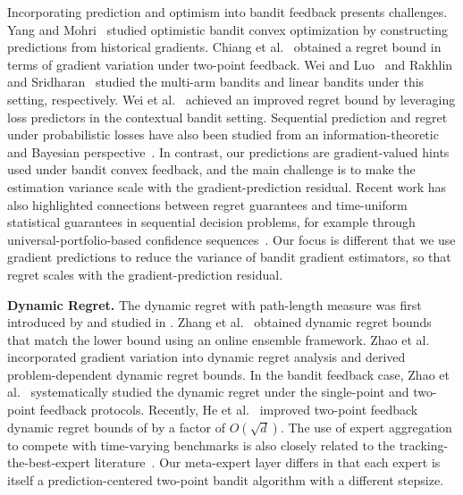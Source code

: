 \documentclass[journal,onecolumn]{IEEEtran}
\theoremstyle{plain}
\theoremstyle{definition}
\theoremstyle{remark}
\begin{document}
Incorporating prediction and optimism into bandit feedback presents challenges. Yang and Mohri~\cite{yang2016optimistic} studied optimistic bandit convex optimization by constructing predictions from historical gradients. Chiang et al.~\cite{chiang2013beating} obtained a regret bound in terms of gradient variation under two-point feedback. Wei and Luo~\cite{wei2018more} and Rakhlin and Sridharan~\cite{rakhlin2013online} studied the multi-arm bandits and linear bandits under this setting, respectively. Wei et al.~\cite{wei2020taking} achieved an improved regret bound by leveraging loss predictors in the contextual bandit setting. Sequential prediction and regret under probabilistic losses have also been
studied from an information-theoretic and Bayesian perspective~\cite{wu2023regret}. In contrast, our predictions are gradient-valued hints
used under bandit convex feedback, and the main challenge is to make the
estimation variance scale with the gradient-prediction residual. Recent work has also highlighted connections between regret guarantees and
time-uniform statistical guarantees in sequential decision problems, for
example through universal-portfolio-based confidence sequences~\cite{orabona2023tight}. Our focus is different that we use gradient predictions
to reduce the variance of bandit gradient estimators, so that regret scales
with the gradient-prediction residual.

\textbf{Dynamic Regret.} The dynamic regret with path-length measure was first introduced by \cite{zinkevich2003online} and studied in \cite{zinkevich2003online,gyorgy2016shifting,zhang2022no}. Zhang et al.~\cite{zhang2018adaptive} obtained dynamic regret bounds that match the lower bound using an online ensemble framework. Zhao et al.~\cite{zhao2024adaptivity} incorporated gradient variation into dynamic regret analysis and derived problem-dependent dynamic regret bounds. In the bandit feedback case, Zhao et al.~\cite{zhao2021bandit} systematically studied the dynamic regret under the single-point and two-point feedback protocols. Recently, He et al.~\cite{he2025non} improved two-point feedback dynamic regret bounds of \cite{zhao2021bandit} by a factor of $O(\sqrt{d})$. The use of expert aggregation to compete with time-varying benchmarks is also
closely related to the tracking-the-best-expert literature~\cite{gyorgy2012efficient}. Our meta-expert layer differs in that each expert
is itself a prediction-centered two-point bandit algorithm with a different
stepsize.
\end{document}
